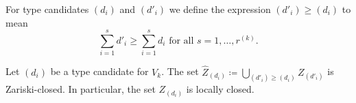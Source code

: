 \begin{definition} \label{def-compare-types}
	For type candidates $(d_i)$ and $(d'_i)$ we define the expression $(d'_i) \geq (d_i)$ to mean
	\[
		\sum_{i=1}^s d'_i \geq \sum_{i=1}^s d_i \text{ for all $s=1,\dotsc, r^{(k)}$}.
	\]
\end{definition}



\begin{proposition}
	Let $(d_i)$ be a type candidate for $V_k$. The set $\widehat Z_{(d_i)} \coloneqq \bigcup_{(d'_i)\geq(d_i)} Z_{(d'_i)}$ is Zariski-closed. In particular, the set $Z_{(d_i)}$ is locally closed.
\end{proposition}

